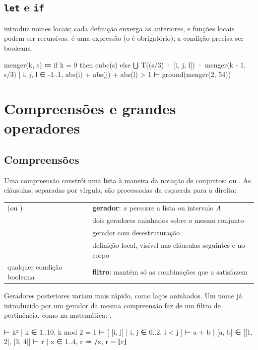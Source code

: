\subsection{\texttt{let} e \texttt{if}}
 introduz nomes locais; cada definição enxerga as anteriores, e funções
locais podem ser recursivas.  é uma expressão (o  é obrigatório); a condição
precisa ser booleana.
\begin{csg}[run, id=menger]
menger(k, s) ≔
  if k = 0 then cube(s)
  else ⋃{ T((s/3) · [i, j, l]) · menger(k - 1, s/3)
        | i, j, l ∈ -1..1, abs(i) + abs(j) + abs(l) > 1 }
⊢ ground(menger(2, 54))
\end{csg}

\section{Compreensões e grandes operadores}\label{sec:compreensao}

\subsection{Compreensões}
Uma compreensão constrói uma lista à maneira da notação de conjuntos:  ou
. As cláusulas, separadas por vírgula, são processadas da esquerda para a direita:
\begin{longtable}{@{}L{0.32}L{0.68}@{}}
\toprule
{} (ou ) & \textbf{gerador}: $x$ percorre a lista ou intervalo $A$ \\
 & dois geradores aninhados sobre o mesmo conjunto \\
 & gerador com desestruturação \\
 & definição local, visível nas cláusulas seguintes e no corpo \\
qualquer condição booleana & \textbf{filtro}: mantém só as combinações que a satisfazem \\
\bottomrule
\end{longtable}
Geradores posteriores variam mais rápido, como laços aninhados. Um nome já introduzido por um gerador da mesma compreensão
faz de  um filtro de pertinência, como na matemática: .
\begin{csg}[run]
⊢ { k² | k ∈ 1..10, k mod 2 = 1 }
⊢ [ [i, j] | i, j ∈ 0..2, i < j ]
⊢ { a + b | [a, b] ∈ [[1, 2], [3, 4]] }
⊢ { r | x ∈ 1..4, r ≔ √x, r = ⌊r⌋ }
\end{csg}

